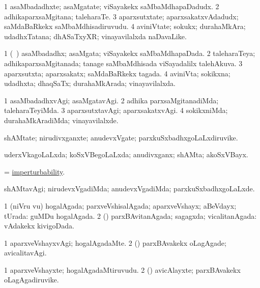 \bentry
{}
\gl{\nA}
\bmng
\bnum
\num{1} asaMbadadhxte; asaMgatate; viSayakekx saMbaMdhapaDadudx. 
\num{2} adhikaparxsaMgitana; taleharaTe. 
\num{3} aparxsutxtate; aparxsakatxvAdadudx; saMdaBaRkekx saMbaMdhisadiruvudu. 
\num{4} aviniVtate; sokukx; durahaMkAra; udadhxTatana; dhASaTxyXR; vinayavilalxda naDavaLike. 
\enum
\emng
\eentry

\bentry
{}
\gl{\gu}
\bmng
\bnum
\num{1} (\kanmu\ \nAyxshA) asaMbadadhx; asaMgata; viSayakekx saMbaMdhapaDada. 
\num{2} taleharaTeya; adhikaparxsaMgitanada; tanage saMbaMdhisada viSayadalilx talehAkuva. 
\num{3} aparxsutxta; aparxsakatx; saMdaBaRkekx tagada. 
\num{4} aviniVta; sokikxna; udadhxta; dhaqSaTx; durahaMkArada; vinayavilalxda. 
\enum
\emng
\eentry

\bentry
{}
\gl{\kirxvi}
\bmng
\bnum
\num{1} asaMbadadhxvAgi; asaMgatavAgi. 
\num{2} adhika parxsaMgitanadiMda; taleharaTeyiMda. 
\num{3} aparxsutxtavAgi; aparxsakatxvAgi. 
\num{4} sokikxniMda; durahaMkAradiMda; vinayavilalxde. 
\enum
\emng
\eentry

\bentry
{}
\gl{\nA}
\bmng
shAMtate; nirudivxganxte; anudevxVgate; parxkuSxbadhxgoLaLxdiruvike. 
\emng
\eentry

\bentry
{}
\gl{\gu}
\bmng
uderxVkagoLaLxda; koSxVBegoLaLxda; anudivxganx; shAMta; akoSxVBayx. 
\emng
\eentry

\bentry
{}
\gl{\nA}
\bmng
 = \hyperlink{imperturbability}{imperturbability}. 
\emng
\eentry

\bentry
{}
\gl{\kirxvi}
\bmng
shAMtavAgi; nirudevxVgadiMda; anudevxVgadiMda; parxkuSxbadhxgoLaLxde. 
\emng
\eentry

\bentry
{}
\gl{\gu}
\bmng
\bnum
\num{1} (niVru \mo vu) hogalAgada; parxveVshisalAgada; aparxveVshayx; aBeVdayx; tUrada:  guMDu hogalAgada. 
\num{2} (\rUpa) parxBAvitanAgada; sagagxda; vicalitanAgada:  vAdakekx kivigoDada. 
\enum
\emng
\eentry

\bentry
{}
\gl{\kirxvi}
\bmng
\bnum
\num{1} aparxveVshayxvAgi; hogalAgadaMte. 
\num{2} (\rUpa) parxBAvakekx oLagAgade; avicalitavAgi. 
\enum
\emng
\eentry

\bentry
{}
\gl{\nA}
\bmng
\bnum
\num{1} aparxveVshayxte; hogalAgadaMtiruvudu. 
\num{2} (\rUpa) avicAlayxte; parxBAvakekx oLagAgadiruvike. 
\enum
\emng
\eentry

